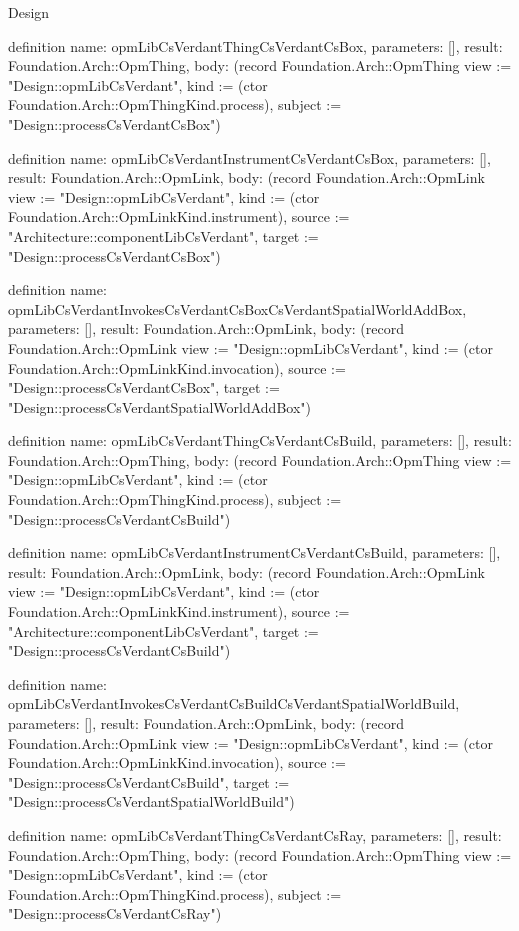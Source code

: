 \begin{lexlean}{Design}
\begin{semanticmodule}
definition{
  name: opmLibCsVerdantThingCsVerdantCsBox,
  parameters: [],
  result: Foundation.Arch::OpmThing,
  body: (record Foundation.Arch::OpmThing {view := "Design::opmLibCsVerdant", kind := (ctor Foundation.Arch::OpmThingKind.process), subject := "Design::processCsVerdantCsBox"})
}

definition{
  name: opmLibCsVerdantInstrumentCsVerdantCsBox,
  parameters: [],
  result: Foundation.Arch::OpmLink,
  body: (record Foundation.Arch::OpmLink {view := "Design::opmLibCsVerdant", kind := (ctor Foundation.Arch::OpmLinkKind.instrument), source := "Architecture::componentLibCsVerdant", target := "Design::processCsVerdantCsBox"})
}

definition{
  name: opmLibCsVerdantInvokesCsVerdantCsBoxCsVerdantSpatialWorldAddBox,
  parameters: [],
  result: Foundation.Arch::OpmLink,
  body: (record Foundation.Arch::OpmLink {view := "Design::opmLibCsVerdant", kind := (ctor Foundation.Arch::OpmLinkKind.invocation), source := "Design::processCsVerdantCsBox", target := "Design::processCsVerdantSpatialWorldAddBox"})
}

definition{
  name: opmLibCsVerdantThingCsVerdantCsBuild,
  parameters: [],
  result: Foundation.Arch::OpmThing,
  body: (record Foundation.Arch::OpmThing {view := "Design::opmLibCsVerdant", kind := (ctor Foundation.Arch::OpmThingKind.process), subject := "Design::processCsVerdantCsBuild"})
}

definition{
  name: opmLibCsVerdantInstrumentCsVerdantCsBuild,
  parameters: [],
  result: Foundation.Arch::OpmLink,
  body: (record Foundation.Arch::OpmLink {view := "Design::opmLibCsVerdant", kind := (ctor Foundation.Arch::OpmLinkKind.instrument), source := "Architecture::componentLibCsVerdant", target := "Design::processCsVerdantCsBuild"})
}

definition{
  name: opmLibCsVerdantInvokesCsVerdantCsBuildCsVerdantSpatialWorldBuild,
  parameters: [],
  result: Foundation.Arch::OpmLink,
  body: (record Foundation.Arch::OpmLink {view := "Design::opmLibCsVerdant", kind := (ctor Foundation.Arch::OpmLinkKind.invocation), source := "Design::processCsVerdantCsBuild", target := "Design::processCsVerdantSpatialWorldBuild"})
}

definition{
  name: opmLibCsVerdantThingCsVerdantCsRay,
  parameters: [],
  result: Foundation.Arch::OpmThing,
  body: (record Foundation.Arch::OpmThing {view := "Design::opmLibCsVerdant", kind := (ctor Foundation.Arch::OpmThingKind.process), subject := "Design::processCsVerdantCsRay"})
}


\end{semanticmodule}
\end{lexlean}
